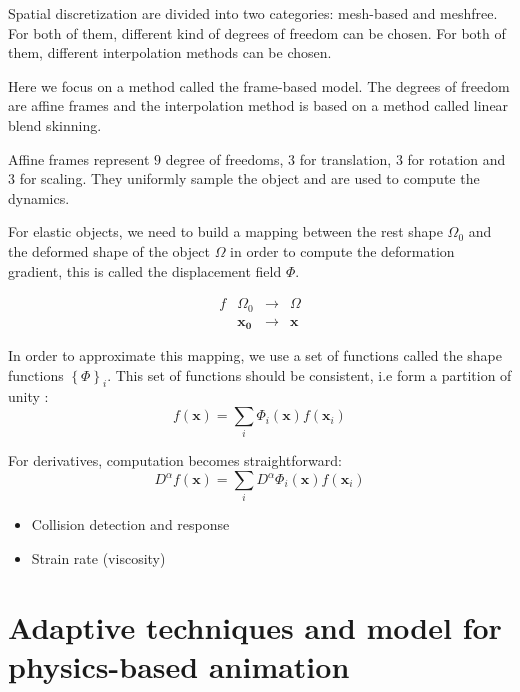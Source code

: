 \documentclass[11pt, oneside, a4paper]{memoir}
\begin{document}
Spatial discretization are divided into two categories: mesh-based and meshfree. For both of them, different kind of degrees of freedom can be chosen. For both of them, different interpolation methods can be chosen. 

Here we focus on a method called the frame-based model. The degrees of freedom are affine frames and the interpolation method is based on a method called linear blend skinning.

Affine frames represent $9$ degree of freedoms, $3$ for translation, $3$ for rotation and $3$ for scaling. They uniformly sample the object and are used to compute the dynamics.

For elastic objects, we need to build a mapping between the rest shape $\Omega_{0}$ and the deformed shape of the object $\Omega$ in order to compute the deformation gradient, this is called the displacement field $\Phi$.

\begin{equation}
\begin{array}{llll}
f & \Omega_{0} & \longrightarrow & \Omega \\
	 & \mathbf{x_{0}} & \longrightarrow & \mathbf{x}
\end{array}
\end{equation}

In order to approximate this mapping, we use a set of functions called the shape functions $\left\lbrace \Phi \right\rbrace_{i}$. This set of functions should be consistent, i.e form a partition of unity :
\begin{equation}
f(\mathbf{x}) = \sum_{i} \Phi_{i}(\mathbf{x}) f(\mathbf{x}_{i})
\end{equation}

For derivatives, computation becomes straightforward:
\begin{equation}
D^{\alpha}f(\mathbf{x}) = \sum_{i} D^{\alpha}\Phi_{i}(\mathbf{x}) f(\mathbf{x}_{i})
\end{equation}

\begin{itemize}
\item Collision detection and response
\item Strain rate (viscosity)
\end{itemize}

\section{Adaptive techniques and model for physics-based animation}
\end{document}
